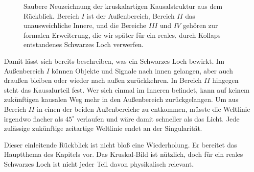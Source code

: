 \begin{figure}[htbp]\centering
{}\caption{Saubere Neuzeichnung der kruskalartigen Kausalstruktur aus dem Rückblick. Bereich \(I\) ist der Außenbereich, Bereich \(II\) das unausweichliche Innere, und die Bereiche \(III\) und \(IV\) gehören zur formalen Erweiterung, die wir später für ein reales, durch Kollaps entstandenes Schwarzes Loch verwerfen.}\end{figure}

Damit lässt sich bereits beschreiben, was ein Schwarzes Loch bewirkt. Im Außenbereich \(I\) können Objekte und Signale nach innen gelangen, aber auch draußen bleiben oder wieder nach außen zurückkehren. In Bereich \(II\) hingegen steht das Kausalurteil fest. Wer sich einmal im Inneren befindet, kann auf keinem zukünftigen kausalen Weg mehr in den Außenbereich zurückgelangen. Um aus Bereich \(II\) in einen der beiden Außenbereiche zu entkommen, müsste die Weltlinie irgendwo flacher als \(45^\circ\) verlaufen und wäre damit schneller als das Licht. Jede zulässige zukünftige zeitartige Weltlinie endet an der Singularität.

Dieser einleitende Rückblick ist nicht bloß eine Wiederholung. Er bereitet das Hauptthema des Kapitels vor. Das Kruskal-Bild ist nützlich, doch für ein reales Schwarzes Loch ist nicht jeder Teil davon physikalisch relevant.

\begin{classroomqa}\end{classroomqa}

